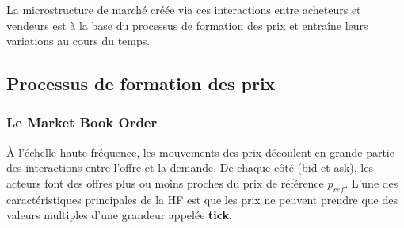 \documentclass[12pt,a4paper]{article}
\theoremstyle{definition}
\theoremstyle{remark}
\begin{document}
    La microstructure de marché créée via ces interactions entre acheteurs et vendeurs est à la base du processus de formation des prix et entraîne leurs variations au cours du temps.

    \subsection{Processus de formation des prix}
    \subsubsection{Le Market Book Order}
    À l'échelle haute fréquence, les mouvements des prix découlent en grande partie des interactions entre l'offre et la demande. De chaque côté (bid et ask), les acteurs font des offres plus ou moins proches du prix de référence $p_{ref}$. L'une des caractéristiques principales de la HF est que les prix ne peuvent prendre que des valeurs multiples d'une grandeur appelée \textbf{tick}. 
    
\end{document}
